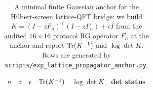 

\begin{table}[H]
\centering
\small
\setlength{\tabcolsep}{8pt}
\renewcommand{\arraystretch}{1.10}
\begin{tabular}{r r r r r l}
\toprule
$n$ & $z$ & $\epsilon$ & $\mathrm{Tr}(K^{-1})$ & $\log\det K$ & det status \\
\midrule
%
\end{tabular}
\caption{A minimal finite Gaussian anchor for the Hilbert-screen lattice-QFT bridge: we build $K=(I-zF_n)^\top(I-zF_n)+\epsilon I$ from the audited $16\times 16$ protocol RG operator $F_n$ at the anchor and report $\mathrm{Tr}(K^{-1})$ and $\log\det K$. Rows are generated by \texttt{scripts/exp\_lattice\_propagator\_anchor.py}.}
\label{tab:lattice_propagator_anchor}
\end{table}

